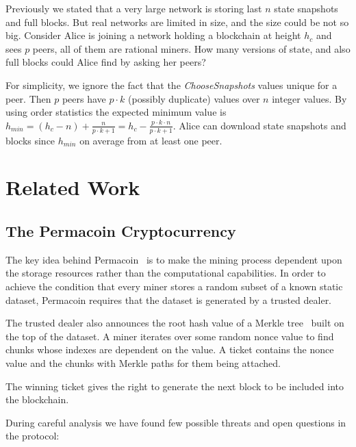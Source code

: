 \documentclass[conference,compsoc]{IEEEtran}
\begin{document}
Previously we stated that a very large network is storing last \(n\) state snapshots and full blocks. But real networks are limited in size, and the size could be not so big. Consider Alice is joining a network holding a blockchain at height \(h_c\) and sees \(p\) peers, all of them are rational miners. How many versions of state, and also full blocks could Alice find by asking her peers? 

For simplicity, we ignore the fact that the \textit{ChooseSnapshots} values unique for a peer. Then \(p\) peers have \(p \cdot k\) (possibly duplicate) values over \(n\) integer values. By using order statistics the expected minimum value is \( h_{min} = (h_c - n) + \frac{n}{p\cdot k+1} = h_c - \frac{p\cdot k\cdot n}{p\cdot k+1}\). Alice can download state snapshots and blocks since \(h_{min}\) on average from at least one peer.


\section{Related Work}

\subsection{The Permacoin Cryptocurrency}

The key idea behind Permacoin~\cite{miller2014permacoin} is to make the mining process dependent upon the storage resources rather than the computational capabilities. In order to achieve the condition that every miner stores a random subset of a known static dataset, Permacoin requires that the dataset is generated by a trusted dealer. 

The trusted dealer also announces the root hash value of a Merkle tree~\cite{merkle1987digital} built on the top of the dataset. A miner iterates over some random nonce value to find chunks whose indexes are dependent on the value. A ticket contains the nonce value and the chunks with Merkle paths for them being attached. 

The winning ticket gives the right to generate the next block  to be included into the blockchain.

During careful analysis we have found few possible threats and open questions in the protocol:
\end{document}

